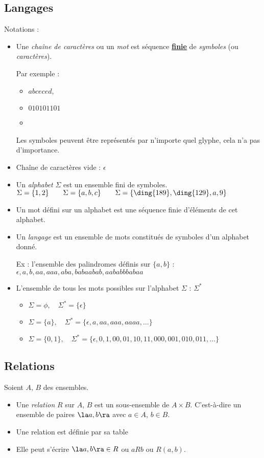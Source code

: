 \subsection{Langages}
\label{subsec:Langages}
Notations :
\begin{itemize}
    \item Une \emph{chaîne de caractères} ou un \emph{mot} est séquence \textbf{\underline{finie}} de \emph{symboles} (ou \emph{caractères}).
    
    Par exemple :
    	\begin{itemize}
    		\item $abceced$,
    		\item $010101101$
    		\item {}
    	\end{itemize}
    	Les symboles peuvent être représentés par n'importe quel glyphe, cela n'a pas d'importance.
	\item Chaîne de caractères vide : $\epsilon$
    \item Un \emph{alphabet} $\Sigma$ est un ensemble fini de symboles. 
    	\subitem $\Sigma = \{1, 2\}\qquad\Sigma = \{a, b, c\}\qquad\Sigma = \{\ding{189},\ding{129},a,9\}$
    \item Un mot défini sur un alphabet est une séquence finie d'éléments de cet alphabet.
    \item Un \emph{langage} est un ensemble de mots constitués de symboles d'un alphabet donné.
     
    	\subitem Ex : l'ensemble des palindromes définis sur $\{a, b\}$ : $\epsilon, a, b, aa, aaa, aba, babaabab, aababbbabaa$
	\item L'ensemble de tous les mots possibles sur l'alphabet $\Sigma$ :\; $\Sigma^*$
		\begin{itemize}
			\item $\Sigma = \phi,\quad \Sigma^* = \{\epsilon\}$
			\item $\Sigma = \{a\},\quad \Sigma^* = \{\epsilon, a,aa,aaa,aaaa, \ldots\}$
			\item $\Sigma = \{0,1\},\quad \Sigma^* = \{\epsilon, 0,1,00,01,10,11,000,001,010,011, \ldots\}$
		\end{itemize}
\end{itemize}


\subsection{Relations}
\label{subsec:relations}
Soient $A$, $B$ des ensembles.
\begin{itemize}
	\item Une \emph{relation} $R$ sur $A$, $B$ est un sous-ensemble de $A \times B$. C'est-à-dire
		un ensemble de paires $\la a,b \ra$ avec $a\in A$, $b\in B$.
	\item Une relation est définie par sa table
	\item Elle peut s'écrire $\la a,b \ra \in R$ ou $aR b$ ou $R(a,b)$.
\end{itemize}

